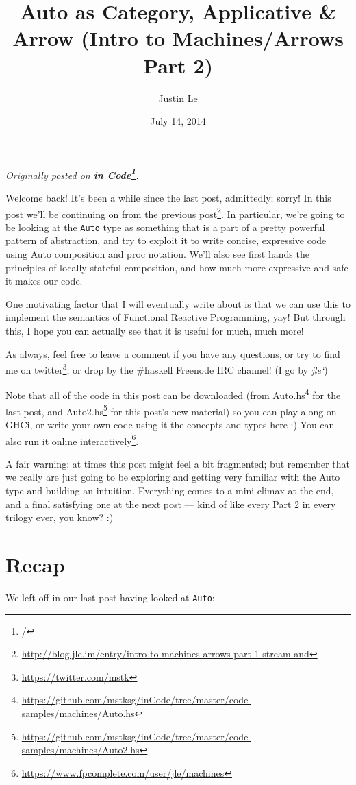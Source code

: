 \documentclass[]{article}
\title{Auto as Category, Applicative \& Arrow (Intro to Machines/Arrows Part 2)}
\author{Justin Le}
\date{July 14, 2014}
\renewcommand{\href}[2]{#2\footnote{\url{#1}}}
\begin{document}
\maketitle

\emph{Originally posted on \textbf{\href{/}{in Code}}.}

Welcome back! It's been a while since the last post, admittedly; sorry!
In this post we'll be continuing on from
\href{http://blog.jle.im/entry/intro-to-machines-arrows-part-1-stream-and}{the
previous post}. In particular, we're going to be looking at the
\texttt{Auto} type as something that is a part of a pretty powerful
pattern of abstraction, and try to exploit it to write concise,
expressive code using Auto composition and proc notation. We'll also see
first hands the principles of locally stateful composition, and how much
more expressive and safe it makes our code.

One motivating factor that I will eventually write about is that we can
use this to implement the semantics of Functional Reactive Programming,
yay! But through this, I hope you can actually see that it is useful for
much, much more!

As always, feel free to leave a comment if you have any questions, or
try to find me on \href{https://twitter.com/mstk}{twitter}, or drop by
the \#haskell Freenode IRC channel! (I go by \emph{jle`})

Note that all of the code in this post can be downloaded (from
\href{https://github.com/mstksg/inCode/tree/master/code-samples/machines/Auto.hs}{Auto.hs}
for the last post, and
\href{https://github.com/mstksg/inCode/tree/master/code-samples/machines/Auto2.hs}{Auto2.hs}
for this post's new material) so you can play along on GHCi, or write
your own code using it the concepts and types here :) You can also run
it \href{https://www.fpcomplete.com/user/jle/machines}{online
interactively}.

A fair warning: at times this post might feel a bit fragmented; but
remember that we really are just going to be exploring and getting very
familiar with the Auto type and building an intuition. Everything comes
to a mini-climax at the end, and a final satisfying one at the next post
--- kind of like every Part 2 in every trilogy ever, you know? :)

\section{Recap}\label{recap}

We left off in our last post having looked at \texttt{Auto}:
\end{document}
